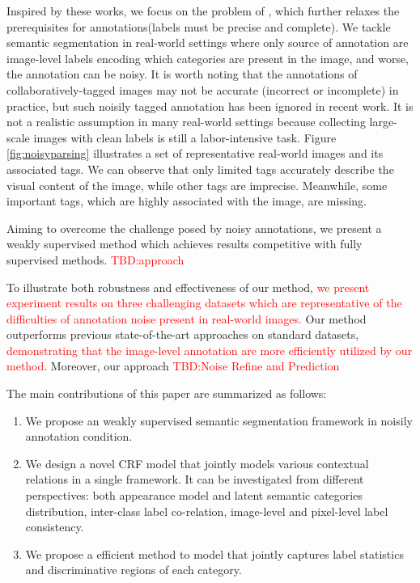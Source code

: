 Inspired by these works, we focus on the problem of , which further relaxes the prerequisites for annotations(\eg labels must be precise and complete). We tackle semantic segmentation in real-world settings where only source of annotation are image-level labels encoding which categories are present in the image, and worse, the annotation can be noisy. It is worth noting that the annotations of collaboratively-tagged images may not be accurate (incorrect or incomplete) in practice, but such noisily tagged annotation has been ignored in recent work. It is not a realistic assumption in many real-world settings because collecting large-scale images with clean labels is still a labor-intensive task. Figure \ref{fig:noisyparsing} illustrates a set of representative real-world images and its associated tags. We can observe that only limited tags accurately describe the visual content of the image, while other tags are imprecise. Meanwhile, some important tags, which are highly associated with the image, are missing.

Aiming to overcome the challenge posed by noisy annotations, we present a weakly supervised method which achieves results competitive with fully supervised methods. {\textcolor{red}{TBD:approach}}

To illustrate both robustness and effectiveness of our method, {\textcolor{red}{we present experiment results on three challenging datasets which are representative of the difficulties of annotation noise present in real-world images.}} Our method outperforms previous state-of-the-art approaches on standard datasets, {\textcolor{red}{demonstrating that the image-level annotation are more efficiently utilized by our method}}. Moreover, our approach {\textcolor{red}{TBD:Noise Refine and Prediction}}

The main contributions of this paper are summarized as follows:
\begin{enumerate}
  \item We propose an weakly supervised semantic segmentation framework in noisily annotation condition.
  \item We design a novel CRF model that jointly models various contextual relations in a single framework. It can be investigated from different perspectives: both appearance model and latent semantic categories distribution, inter-class label co-relation, image-level and pixel-level label consistency.
  \item We propose a efficient method to model that jointly captures label statistics and discriminative regions of each category.
\end{enumerate}

